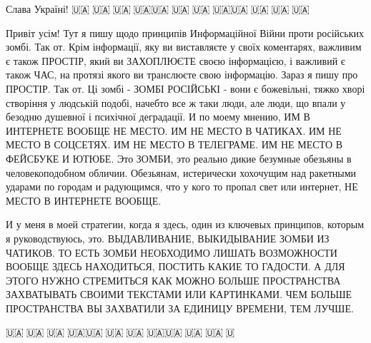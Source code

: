  
 
 
 
 

Слава Україні! 
🇺🇦🔱🇺🇦🔱🇺🇦🔱🇺🇦🇺🇦🔱🇺🇦🔱🇺🇦🔱🇺🇦🇺🇦🔱🇺🇦🔱🇺🇦🔱🇺🇦

Привіт усім! Тут я пишу щодо принципів Информаційної Війни проти російських
зомбі. Так от.  Крім інформації, яку ви виставляєте у своїх коментарях,
важливим є також ПРОСТІР, який ви ЗАХОПЛЮЄТЕ своєю інформацією, і важливий є
також ЧАС, на протязі якого ви транслюєте свою інформацію. Зараз я пишу про
ПРОСТІР.  Так от. Ці зомбі - ЗОМБІ РОСІЙСЬКІ - вони є божевільні, тяжко хворі
створіння у людській подобі, начебто все ж таки люди, але люди, що впали у
безодню душевної і психічної деградації.  И по моему мнению, ИМ В ИНТЕРНЕТЕ
ВООБЩЕ НЕ МЕСТО. ИМ НЕ МЕСТО В ЧАТИКАХ. ИМ НЕ МЕСТО В СОЦСЕТЯХ. ИМ НЕ МЕСТО В
ТЕЛЕГРАМЕ. ИМ НЕ МЕСТО В ФЕЙСБУКЕ И ЮТЮБЕ. Это ЗОМБИ, это реально дикие
безумные обезьяны в человекоподобном обличии. Обезьянам, истерически хохочущим
над ракетными ударами по городам и радующимся, что у кого то пропал свет или
интернет, НЕ МЕСТО В ИНТЕРНЕТЕ ВООБЩЕ.

И у меня в моей стратегии, 
когда я здесь, один из ключевых принципов, которым я руководствуюсь, это. ВЫДАВЛИВАНИЕ, ВЫКИДЫВАНИЕ ЗОМБИ ИЗ ЧАТИКОВ. ТО ЕСТЬ ЗОМБИ НЕОБХОДИМО ЛИШАТЬ ВОЗМОЖНОСТИ ВООБЩЕ ЗДЕСЬ НАХОДИТЬСЯ, ПОСТИТЬ КАКИЕ ТО ГАДОСТИ. А ДЛЯ ЭТОГО НУЖНО СТРЕМИТЬСЯ КАК МОЖНО БОЛЬШЕ ПРОСТРАНСТВА ЗАХВАТЫВАТЬ СВОИМИ ТЕКСТАМИ ИЛИ КАРТИНКАМИ. ЧЕМ БОЛЬШЕ ПРОСТРАНСТВА ВЫ ЗАХВАТИЛИ ЗА ЕДИНИЦУ ВРЕМЕНИ, ТЕМ ЛУЧШЕ. 

🇺🇦🔱🇺🇦🔱🇺🇦🔱🇺🇦🇺🇦🔱🇺🇦🔱🇺🇦🔱🇺🇦🇺🇦🔱🇺🇦🔱🇺🇦🔱🇺
